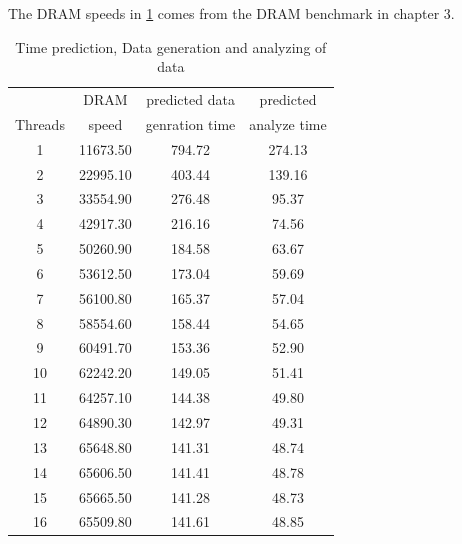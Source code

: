 \documentclass[12pt,a4paper,USenglish]{article}      %
\begin{document}
The DRAM speeds in \ref{tab:DramOnlyPrediction} comes from the DRAM benchmark in chapter 3. 

\begin{table}[!hbtp]
\begin{tabular}{ |c|c|c|c| } 
\hline
 & DRAM & predicted data & predicted \\
Threads & speed & genration time & analyze time \\
\hline
1 & 11673.50 & 794.72 & 274.13 \\
\hline
2 & 22995.10 & 403.44 & 139.16 \\
\hline
3 & 33554.90 & 276.48 & 95.37 \\
\hline
4 & 42917.30 & 216.16 & 74.56 \\
\hline
5 & 50260.90 & 184.58 & 63.67 \\
\hline
6 & 53612.50 & 173.04 & 59.69 \\
\hline
7 & 56100.80 & 165.37 & 57.04 \\
\hline
8 & 58554.60 & 158.44 & 54.65 \\
\hline
9 & 60491.70 & 153.36 & 52.90 \\
\hline
10 & 62242.20 & 149.05 & 51.41 \\
\hline
11 & 64257.10 & 144.38 & 49.80 \\
\hline
12 & 64890.30 & 142.97 & 49.31 \\
\hline
13 & 65648.80 & 141.31 & 48.74 \\
\hline
14 & 65606.50 & 141.41 & 48.78 \\
\hline
15 & 65665.50 & 141.28 & 48.73 \\
\hline
16 & 65509.80 & 141.61 & 48.85 \\
\hline
\end{tabular}
\caption{Time prediction, Data generation and analyzing of data}
\label{tab:DramOnlyPrediction}
\end{table}
\end{document}
